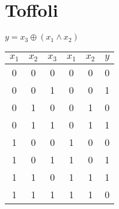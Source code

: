 \documentclass{iansnotes}
\begin{document}
\section{Toffoli}
$y = x_3 \oplus (x_1 \land x_2)$
\begin{table}
  \begin{tabular}{ccc|ccc}
    $x_1$ & $x_2$ & $x_3$ & $x_1$ & $x_2$ & $y$ \\
    \midrule
    0 & 0 & 0 & 0 & 0 & 0 \\
    0 & 0 & 1 & 0 & 0 & 1 \\
    0 & 1 & 0 & 0 & 1 & 0 \\
    0 & 1 & 1 & 0 & 1 & 1 \\
    1 & 0 & 0 & 1 & 0 & 0 \\
    1 & 0 & 1 & 1 & 0 & 1 \\
    1 & 1 & 0 & 1 & 1 & 1 \\
    1 & 1 & 1 & 1 & 1 & 0 \\
  \end{tabular}
\end{table}\\[4mm]
\end{document}
